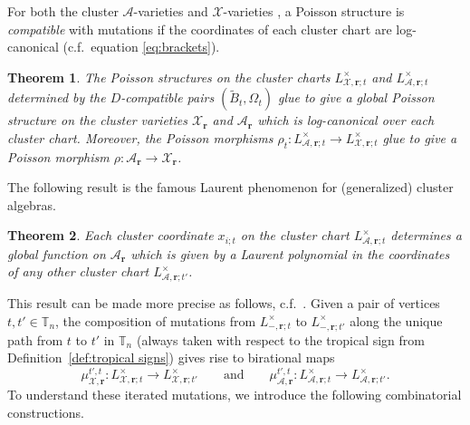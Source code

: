 \documentclass{amsart}
\newtheorem{theorem}{Theorem}[section]
\numberwithin{equation}{section}
\newcommand{\bfr}{{\boldsymbol{r}}}
\newcommand{\cA}{\mathcal{A}}
\newcommand{\cX}{\mathcal{X}}
\newcommand{\TT}{\mathbb{T}}
\begin{document}
For both the cluster $\cA$-varieties \cite{GSV10} and $\cX$-varieties \cite{FG09c}, a Poisson structure is \emph{compatible} with mutations if the coordinates of each cluster chart are log-canonical (c.f.\ equation \eqref{eq:brackets}).
\begin{theorem}
  \cite{GSV10}
  The Poisson structures on the cluster charts $L^\times_{\cX,\bfr;t}$ and $L^\times_{\cA,\bfr;t}$ determined by the $D$-compatible pairs $(\tilde B_t,\Omega_t)$ glue to give a global Poisson structure on the cluster varieties $\cX_\bfr$ and $\cA_\bfr$ which is log-canonical over each cluster chart.
  Moreover, the Poisson morphisms $\rho_t:L^\times_{\cA,\bfr;t}\to L^\times_{\cX,\bfr;t}$ glue to give a Poisson morphism $\rho:\cA_\bfr\to\cX_\bfr$.
\end{theorem}

The following result is the famous Laurent phenomenon for (generalized) cluster algebras.
\begin{theorem}
  \cite{FZ02,CS14}
  Each cluster coordinate $x_{i;t}$ on the cluster chart $L^\times_{\cA,\bfr;t}$ determines a global function on $\cA_\bfr$ which is given by a Laurent polynomial in the coordinates of any other cluster chart $L^\times_{\cA,\bfr;t'}$.
\end{theorem}

This result can be made more precise as follows, c.f.\ \cite{FZ07,Nak15,NR16}.
Given a pair of vertices $t,t'\in\TT_n$, the composition of mutations from $L^\times_{-,\bfr;t}$ to $L^\times_{-,\bfr;t'}$ along the unique path from $t$ to $t'$ in $\TT_n$ (always taken with respect to the tropical sign from Definition~\ref{def:tropical signs}) gives rise to birational maps
\[\mu_{\cX,\bfr}^{t',t}:L^\times_{\cX,\bfr;t}\to L^\times_{\cX,\bfr;t'}\qquad\text{and}\qquad\mu_{\cA,\bfr}^{t',t}:L^\times_{\cA,\bfr;t}\to L^\times_{\cA,\bfr;t'}.\]
To understand these iterated mutations, we introduce the following combinatorial constructions.
\end{document}
